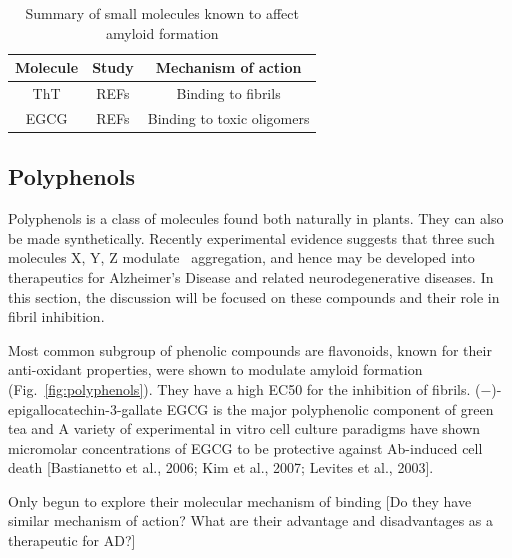 \begin{table}%
  \begin{center}
  \vspace{10pt}
  \caption{Summary of small molecules known to affect amyloid formation}
  \label{tbl:inhibitors}
    \begin{tabular}{| c | c | c |}
      \hline
      Molecule & Study & Mechanism of action \\
      \hline
      ThT & REFs & Binding to fibrils \\
      EGCG & REFs & Binding to toxic oligomers \\
	  \hline
    \end{tabular}
  \end{center}
\end{table}

\subsection{Polyphenols}
Polyphenols is a class of molecules found both naturally in plants. They can also be made synthetically. Recently experimental evidence suggests that three such molecules X, Y, Z modulate \abeta\ aggregation, and hence may be developed into therapeutics for Alzheimer's Disease and related neurodegenerative diseases.  In this section, the discussion will be focused on these compounds and their role in fibril inhibition.

Most common subgroup of phenolic compounds are flavonoids, known for their anti-oxidant properties, were shown to modulate amyloid formation (Fig.~\ref{fig:polyphenols}). They have a high EC50 for the inhibition of fibrils.   (−)-epigallocatechin-3-gallate EGCG is the major polyphenolic component of green tea and  A variety of experimental in vitro cell culture paradigms have shown micromolar concentrations of EGCG to be protective against Ab-induced cell death [Bastianetto et al., 2006; Kim et al., 2007; Levites et al., 2003].

Only begun to explore their molecular mechanism of binding [Do they have similar mechanism of action? What are their advantage and disadvantages as a therapeutic for AD?]


